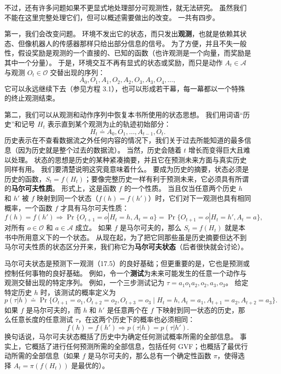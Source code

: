 \documentclass[UTF8, 12pt, fontset=fandol, oneside]{ctexart}
\begin{document}
不过，还有许多问题如果不更显式地处理部分可观测性，就无法研究。
虽然我们不能在这里完整处理它们，但可以概述需要做出的改变。
一共有四步。

第一，我们会改变问题。
环境不发出它的状态，而只发出\textbf{观测}，也就是依赖其状态、但像机器人的传感器那样只给出部分信息的信号。
为了方便，并且不失一般性，假设奖励是观测的一个直接的、已知的函数（也许观测是一个向量，而奖励是其中一个分量）。
于是，环境交互不再有显式的状态或奖励，而只是动作 $A_t\in\mathcal{A}$ 与观测 $O_t\in\mathcal{O}$ 交替出现的序列：
\[
A_0,O_1,A_1,O_2,A_2,O_3,A_3,O_4,\ldots,
\]
它可以永远继续下去（参见方程 3.1），也可以形成若干幕，每一幕都以一个特殊的终止观测结束。

第二，我们可以从观测和动作序列中恢复本书所使用的状态思想。
我们用词语“历史”和记号 $H_t$ 表示直到某个观测为止的轨迹初始部分：
\[
H_t\doteq A_0,O_1,\ldots,A_{t-1},O_t.
\]
历史表示在不查看数据流之外任何内容的情况下，我们关于过去所能知道的最多信息（因为历史就是整个过去的数据流）。
当然，历史会随着 $t$ 增长而变得巨大且难以处理。
状态的思想是历史的某种紧凑摘要，并且它在预测未来方面与真实历史同样有用。
我们要清楚说明这究竟意味着什么。
要成为历史的摘要，状态必须是历史的函数，$S_t=f(H_t)$；要像完整历史一样有利于预测未来，它必须具有所谓的\textbf{马尔可夫性质}。
形式上，这是函数 $f$ 的一个性质。
当且仅当任意两个历史 $h$ 和 $h'$ 被 $f$ 映射到同一个状态（$f(h)=f(h')$）时，它们对下一观测也具有相同概率，一个函数 $f$ 才具有马尔可夫性质：
\begin{equation}
f(h)=f(h')\Rightarrow
\Pr\{O_{t+1}=o|H_t=h,A_t=a\}
=
\Pr\{O_{t+1}=o|H_t=h',A_t=a\},
\tag{17.5}
\end{equation}
对所有 $o\in\mathcal{O}$ 和 $a\in\mathcal{A}$ 成立。
如果 $f$ 是马尔可夫的，那么 $S_t=f(H_t)$ 就是本书中所用意义下的一个状态。
从现在起，为了把它同那些虽是历史摘要但达不到马尔可夫性质的状态区分开来，我们称它为\textbf{马尔可夫状态}（后者很快就会讨论）。

马尔可夫状态是预测下一观测（17.5）的良好基础；但更重要的是，它也是预测或控制任何事物的良好基础。
例如，令一个\textbf{测试}为未来可能发生的任意一个动作与观测交替出现的特定序列。
例如，一个三步测试记为 $\tau=a_1o_1a_2,o_2,a_3,o_3$。
给定特定历史 $h$ 时，该测试的概率定义为
\begin{equation}
p(\tau|h)\doteq
\Pr\{O_{t+1}=o_1,O_{t+2}=o_2,O_{t+3}=o_3
\mid H_t=h,A_t=a_1,A_{t+1}=a_2,A_{t+2}=a_3\}.
\tag{17.6}
\end{equation}
如果 $f$ 是马尔可夫的，而 $h$ 和 $h'$ 是任意两个在 $f$ 下映射到同一状态的历史，那么任意长度的任意测试 $\tau$，在这两个历史下的概率也必须相同：
\begin{equation}
f(h)=f(h')\Rightarrow p(\tau|h)=p(\tau|h').
\tag{17.7}
\end{equation}
换句话说，马尔可夫状态概括了历史中为确定任何测试概率所需的全部信息。
事实上，它概括了进行任何预测所需的全部信息，包括任何 GVF；也概括了最优行动所需的全部信息（如果 $f$ 是马尔可夫的，那么总有一个确定性函数 $\pi$，使得选择 $A_t=\pi(f(H_t))$ 是最优的）。
\end{document}
